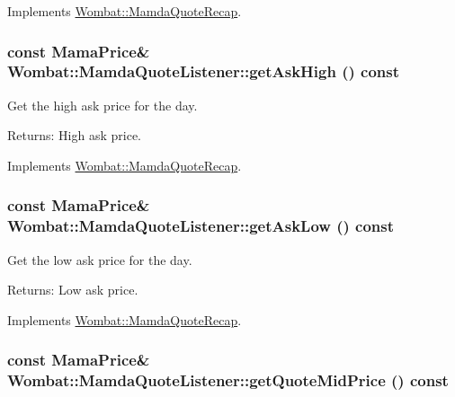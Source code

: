 Implements \hyperlink{classWombat_1_1MamdaQuoteRecap_f18eefde8f4c853642da3176bb7cf84e}{Wombat::Mamda\-Quote\-Recap}.\hypertarget{classWombat_1_1MamdaQuoteListener_44860382a77a09c7fcca4bcd2e92e1ae}{
\subsubsection[getAskHigh]{\setlength{\rightskip}{0pt plus 5cm}const Mama\-Price\& Wombat::Mamda\-Quote\-Listener::get\-Ask\-High () const}}
\label{classWombat_1_1MamdaQuoteListener_44860382a77a09c7fcca4bcd2e92e1ae}


Get the high ask price for the day. 

\begin{Desc}
\item[Returns:]High ask price. \end{Desc}


Implements \hyperlink{classWombat_1_1MamdaQuoteRecap_d775066ddd925c5cfc3f736b6da9b3d8}{Wombat::Mamda\-Quote\-Recap}.\hypertarget{classWombat_1_1MamdaQuoteListener_5c3d63363fd9894fc2949fd769b3af00}{
\subsubsection[getAskLow]{\setlength{\rightskip}{0pt plus 5cm}const Mama\-Price\& Wombat::Mamda\-Quote\-Listener::get\-Ask\-Low () const}}
\label{classWombat_1_1MamdaQuoteListener_5c3d63363fd9894fc2949fd769b3af00}


Get the low ask price for the day. 

\begin{Desc}
\item[Returns:]Low ask price. \end{Desc}


Implements \hyperlink{classWombat_1_1MamdaQuoteRecap_0d1047a74037b9bf740e1ac49e602ae2}{Wombat::Mamda\-Quote\-Recap}.\hypertarget{classWombat_1_1MamdaQuoteListener_b74788d3c90fce551bab93ed062a0458}{
\subsubsection[getQuoteMidPrice]{\setlength{\rightskip}{0pt plus 5cm}const Mama\-Price\& Wombat::Mamda\-Quote\-Listener::get\-Quote\-Mid\-Price () const}}
\label{classWombat_1_1MamdaQuoteListener_b74788d3c90fce551bab93ed062a0458}


